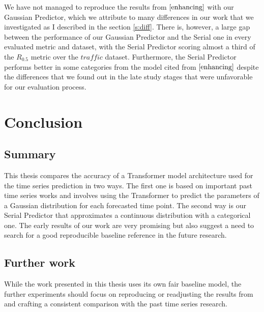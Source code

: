 \documentclass[en]{pracamgr}
\begin{document}
We have not managed to reproduce the results from $\cite{enhancing}$ with our Gaussian Predictor, which we attribute to many differences in our work that we investigated as I described in the section \ref{s:diff}. There is, however, a large gap between the performance of our Gaussian Predictor and the Serial one in every evaluated metric and dataset, with the Serial Predictor scoring almost a third of the $R_{0.5}$ metric over the $traffic$ dataset. Furthermore, the Serial Predictor performs better in some categories from the model cited from $\cite{enhancing}$ despite the differences that we found out in the late study stages that were unfavorable for our evaluation process.







\chapter{Conclusion}

\section{Summary}

This thesis compares the accuracy of a Transformer model architecture used for the time series prediction in two ways. The first one is based on important past time series works and involves using the Transformer to predict the parameters of a Gaussian distribution for each forecasted time point. The second way is our Serial Predictor that approximates a continuous distribution with a categorical one. The early results of our work are very promising but also suggest a need to search for a good reproducible baseline reference in the future research.

\section{Further work}

While the work presented in this thesis uses its own fair baseline model, the further experiments should focus on reproducing or readjusting the results from \cite{enhancing} and crafting a consistent comparison with the past time series research.
\end{document}
